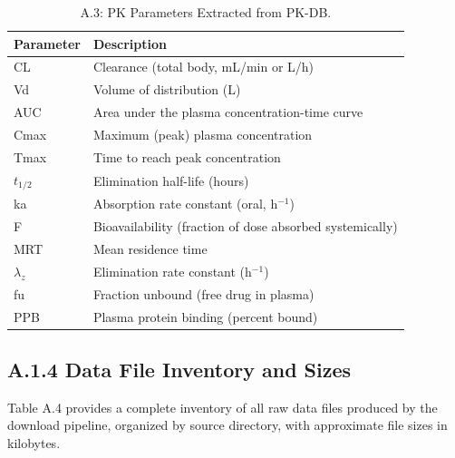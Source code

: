 \documentclass[a4paper,11pt,twoside]{report}
\begin{document}
\begin{table}[htbp]
\centering
\small
\caption{A.3: PK Parameters Extracted from PK-DB.}
\label{tab:pk_parameters}
\begin{tabular}{l|l}
\hline
\textbf{Parameter} & \textbf{Description} \\
\hline
CL & Clearance (total body, mL/min or L/h) \\
Vd & Volume of distribution (L) \\
AUC & Area under the plasma concentration-time curve \\
Cmax & Maximum (peak) plasma concentration \\
Tmax & Time to reach peak concentration \\
$t_{1/2}$ & Elimination half-life (hours) \\
ka & Absorption rate constant (oral, h$^{-1}$) \\
F & Bioavailability (fraction of dose absorbed systemically) \\
MRT & Mean residence time \\
$\lambda_z$ & Elimination rate constant (h$^{-1}$) \\
fu & Fraction unbound (free drug in plasma) \\
PPB & Plasma protein binding (percent bound) \\
\hline
\end{tabular}
\end{table}

\subsection*{A.1.4 Data File Inventory and Sizes}

Table A.4 provides a complete inventory of all raw data files produced by the download pipeline, organized by source directory, with approximate file sizes in kilobytes.
\end{document}
